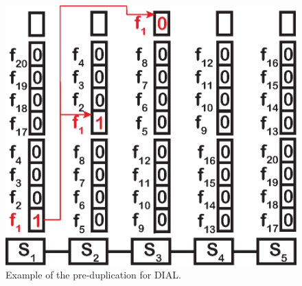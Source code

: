 \begin{figure}
    \centering
    \includegraphics[width=0.6\linewidth]{pic/exam-dial-predup}
    \caption{Example of the pre-duplication for DIAL.}
    \label{fig:exam-dial-predup}
    \vspace{-0.1in}

\end{figure}
